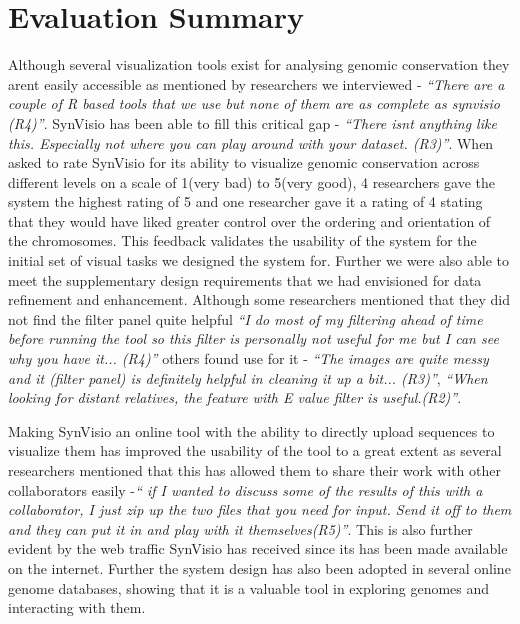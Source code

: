 \section{Evaluation Summary}  
Although several visualization tools exist for analysing genomic conservation they arent easily accessible as mentioned by researchers we interviewed -  \textit{``There are a couple of R based tools that we use but none of them are as complete as synvisio (R4)''}. SynVisio has been able to fill this critical gap
- \textit{``There isnt anything like this. Especially not where you can play around with your dataset. (R3)''}. When asked to rate SynVisio for its ability to visualize genomic conservation across different levels on a scale of 1(very bad) to 5(very good), 4 researchers gave the system the highest rating of 5 and one researcher gave it a rating of 4 stating that they would have liked greater control over the ordering and orientation of the chromosomes. This feedback validates the usability of the system for the initial set of visual tasks we designed the system for. Further we were also able to meet the supplementary design requirements that we had envisioned for data refinement and enhancement. Although some researchers mentioned that they did not find the filter panel quite helpful \textit{``I do most of my filtering ahead of time before running the tool so this filter is personally not useful for me but I can see why you have it...
 (R4)''} others found use for it - \textit{``The images are quite messy and it (filter panel) is definitely helpful in cleaning it up a bit... (R3)''}, \textit{``When looking for distant relatives, the feature with E value filter is useful.(R2)''}. 
 
Making SynVisio an online tool with the ability to directly upload sequences to visualize them has improved the usability of the tool to a great extent as several researchers mentioned that this has allowed them to share their work with other collaborators easily -\textit{`` if I wanted to discuss some of the results of this with a collaborator, I just zip up the two files that you need for input. Send it off to them and they can put it in and play with it themselves(R5)''}. This is also further evident by the web traffic SynVisio has received since its has been made available on the internet. Further the system design has also been adopted in several online genome databases, showing that it is a valuable tool in exploring genomes and interacting with them.



